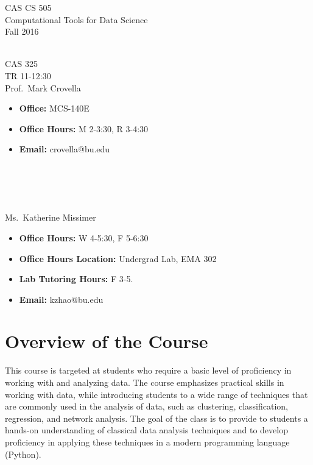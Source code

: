 \documentclass[11pt]{article}
\begin{document}
\sloppy 
\begin{center}
\LARGE CAS CS 505\\
\Large Computational Tools for Data Science\\
\Large\rm Fall 2016\\~\\
\end{center}

 CAS 325\\[\baselineskip]
 TR 11-12:30
\\[\baselineskip] 

 Prof.\ Mark Crovella\\[0.75\baselineskip]
\begin{minipage}[t]{0.60\textwidth}
\begin{itemize}
\item {\bf Office:} MCS-140E
\item {\bf Office Hours:} {\small M 2-3:30, R 3-4:30}
\item {\bf Email:} crovella@bu.edu
\end{itemize}
\end{minipage}
~\\~\\~\\~\\
  Ms.\ Katherine Missimer\\[0.75\baselineskip]
 \begin{minipage}[t]{0.60\textwidth}
 \begin{itemize}
 \item {\bf Office Hours:} {\small W 4-5:30, F 5-6:30}
 \item {\bf Office Hours Location:} Undergrad Lab, EMA 302
 \item {\bf Lab Tutoring Hours:} {\small F 3-5.}
 \item {\bf Email:} kzhao@bu.edu
 \end{itemize}
 \end{minipage}

\section*{Overview of the Course}

This course is targeted at students who require a basic level of
proficiency in working with and analyzing data.  The course emphasizes
practical skills in working with data, while introducing students to a
wide range of techniques that are commonly used in the analysis of data,
such as clustering, classification, regression, and network analysis.
The goal of the class is to provide to students a hands-on understanding
of classical data analysis techniques and to develop proficiency in
applying these techniques in a modern programming language (Python). 
\end{document}
